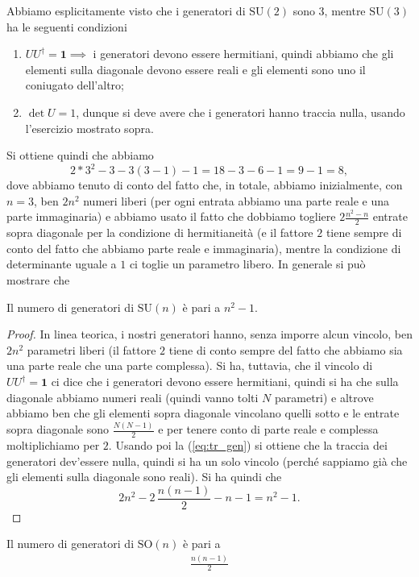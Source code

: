 Abbiamo esplicitamente visto che i generatori di $\text{SU}(2)$ sono $3$, mentre $\text{SU}(3)$ ha le seguenti condizioni
\begin{enumerate}[label=\protect\circled{\arabic*}]
    \item $U U^\dagger = \mathbf{1} \implies$ i generatori devono essere hermitiani, quindi abbiamo che gli elementi sulla diagonale devono essere reali e gli elementi sono uno il coniugato dell'altro;
    \item $\det{U} = 1$, dunque si deve avere che i generatori hanno traccia nulla, usando l'esercizio mostrato sopra.      
\end{enumerate}
Si ottiene quindi che abbiamo
$$
    2 * 3^2 - 3 - 3(3-1) - 1 = 18 - 3 - 6 - 1 = 9 - 1 = 8,
$$
dove abbiamo tenuto di conto del fatto che, in totale, abbiamo inizialmente, con $n=3$, ben $2n^2$ numeri liberi (per ogni entrata abbiamo una parte reale e una parte immaginaria) e abbiamo usato il fatto che dobbiamo togliere $2 \frac{n^2 - n}{2}$ entrate sopra diagonale per
la condizione di hermitianeità (e il fattore $2$ tiene sempre di conto del fatto che abbiamo parte reale e immaginaria), mentre la condizione di determinante uguale a $1$ ci toglie un parametro libero. In generale si può mostrare che
\begin{exercise}
    Il numero di generatori di $\text{SU}(n)$ è pari a $n^2 - 1$.
\end{exercise}
\begin{proof}
    In linea teorica, i nostri generatori hanno, senza imporre alcun vincolo, ben $2n^2$ parametri liberi (il fattore $2$ tiene di conto sempre del fatto che abbiamo sia una parte reale che una parte complessa). Si ha, tuttavia, che il vincolo di $UU^\dagger = \mathbf{1}$ ci dice che i generatori
    devono essere hermitiani, quindi si ha che sulla diagonale abbiamo numeri reali (quindi vanno tolti $N$ parametri) e altrove abbiamo ben che gli elementi sopra diagonale vincolano quelli sotto e le entrate sopra diagonale sono $\frac{N(N-1)}{2}$ e per tenere conto di parte reale e complessa moltiplichiamo per $2$.
    Usando poi la (\ref{eq:tr_gen}) si ottiene che la traccia dei generatori dev'essere nulla, quindi si ha un solo vincolo (perché sappiamo già che gli elementi sulla diagonale sono reali). Si ha quindi che
    \begin{equation}
        2n^2 - 2 \, \frac{n(n-1)}{2} - n - 1 = n^2 - 1. 
    \end{equation}
\end{proof}
\begin{exercise}
    Il numero di generatori di $\text{SO}(n)$ è pari a
    \begin{align}
        \frac{n(n-1)}{2}
    \end{align}
\end{exercise}
